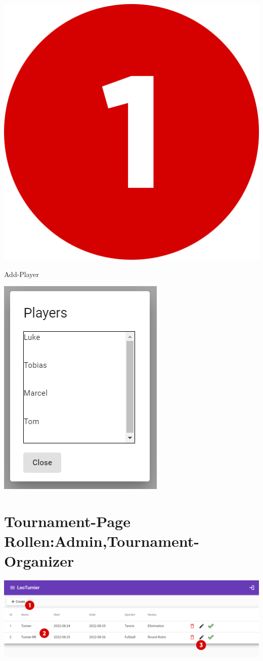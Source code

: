 \bigskip
\includegraphics[scale=0.05]{pics/user-guide/numbers/number-1.png} \begin{LARGE} Add-Player \end{LARGE}

\includegraphics[scale=0.5]{pics/user-guide/add-player.PNG}

\newpage
\section{Tournament-Page Rollen:Admin,Tournament-Organizer}
\includegraphics[scale=0.4]{pics/user-guide/tournament-overview-page.PNG}

